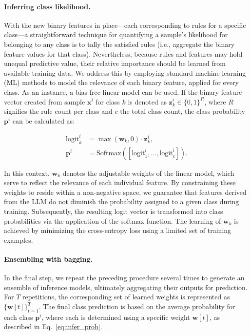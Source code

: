 \paragraph{Inferring class likelihood.} With the new binary features in place—each corresponding to rules for a specific class—a straightforward technique for quantifying a sample’s likelihood for belonging to any class is to tally the satisfied rules (i.e., aggregate the binary feature values for that class). Nevertheless, because rules and features may hold unequal predictive value, their relative importance should be learned from available training data. We address this by employing standard machine learning (ML) methods to model the relevance of each binary feature, applied for every class. As an instance, a bias-free linear model can be used. If the binary feature vector created from sample $\mathbf{x}^i$ for class $k$ is denoted as $\mathbf{z}_k^i \in \{0, 1\}^R$, where $R$ signifies the rule count per class and $c$ the total class count, the class probability $\mathbf{p}^i$ can be calculated as:

\begin{align}
\text{logit}_k^i &= \max(\mathbf{w}_k, 0) \cdot \mathbf{z}_k^i, \nonumber \\
\mathbf{p}^i &= \text{Softmax}({[\text{logit}_{1}^i, ..., \text{logit}_{c}^i]}). \label{eq:infer_prob}
\end{align}

In this context, $\mathbf{w}_k$ denotes the adjustable weights of the linear model, which serve to reflect the relevance of each individual feature. By constraining these weights to reside within a non-negative space, we guarantee that features derived from the LLM do not diminish the probability assigned to a given class during training. Subsequently, the resulting logit vector is transformed into class probabilities via the application of the softmax function. The learning of $\mathbf{w}_k$ is achieved by minimizing the cross-entropy loss using a limited set of training examples.

\vspace*{-0.12in}
\paragraph{Ensembling with bagging.} In the final step, we repeat the preceding procedure several times to generate an ensemble of inference models, ultimately aggregating their outputs for prediction. For $T$ repetitions, the corresponding set of learned weights is represented as $\{\mathbf{w}[t]\}_{t=1}^T$. The final class prediction is based on the average probability for each class $\mathbf{p}^i$, where each is determined using a specific weight $\mathbf{w}[t]$, as described in Eq.~\ref{eq:infer_prob}.

